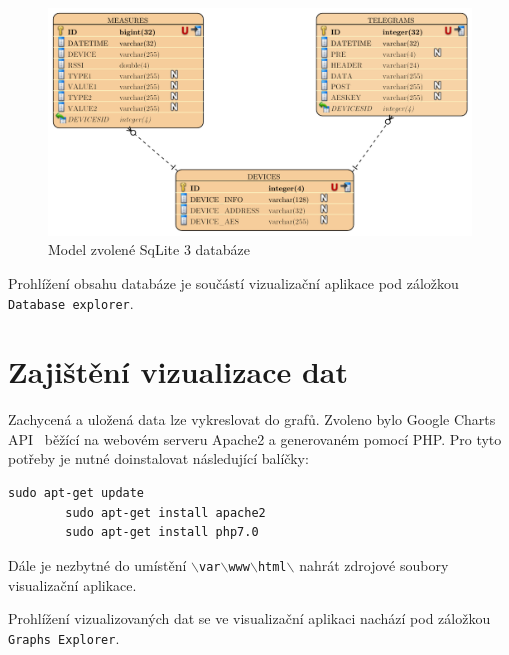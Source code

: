 \begin{figure}[!ht]
  \begin{center}
    \includegraphics[scale=0.55]{obrazky/aplikace_databaze}
  \end{center}
	\vspace{-10pt}
  \caption{Model zvolené SqLite 3 databáze}
	\label{databazovy_model}
\end{figure}

Prohlížení obsahu databáze je součástí vizualizační aplikace pod záložkou \texttt{Database explorer}.
	
\section{Zajištění vizualizace dat}	
\label{SectionVizualizaceDat}
Zachycená a uložená data lze vykreslovat do grafů. Zvoleno bylo Google Charts API~\cite{uvod_google_charts_api} běžící na webovém serveru Apache2 a generovaném pomocí PHP. Pro tyto potřeby je nutné doinstalovat následující balíčky:
 
\begin{lstlisting}[style=MyCodeBash]
		sudo apt-get update
		sudo apt-get install apache2
		sudo apt-get install php7.0 
	\end{lstlisting}

Dále je nezbytné do umístění \texttt{$\backslash$var$\backslash$www$\backslash$html$\backslash$} nahrát zdrojové soubory visualizační aplikace. 

Prohlížení vizualizovaných dat se ve visualizační aplikaci nachází pod záložkou \texttt{Graphs Explorer}.

